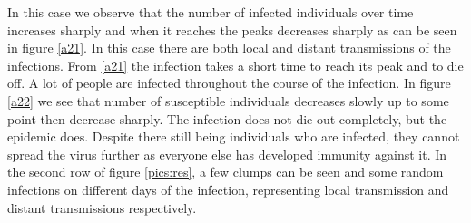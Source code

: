 In this case we observe that the number of infected individuals over time increases sharply and when it reaches the peaks decreases sharply as can be seen in figure \ref{a21}. In this case there are  both local and distant transmissions of the infections. From \ref{a21} the infection takes a short time to reach its peak and to die off. A lot of people are infected throughout the course of the infection. In figure \ref{a22} we see that number of susceptible individuals decreases slowly up to some point then decrease sharply. The infection does not die out completely, but the epidemic does. Despite there still being individuals who are infected, they cannot spread the virus further as everyone else has developed immunity against it. In the second row of figure \ref{pics:res}, a few clumps can be seen and some random  infections on different days of the infection, representing local transmission and distant transmissions respectively.

